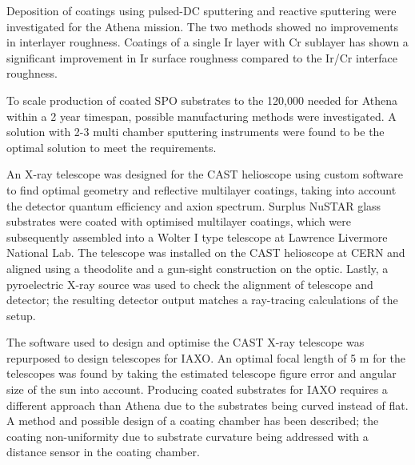Deposition of coatings using pulsed-DC sputtering and reactive sputtering were investigated for the Athena mission. The two methods showed no improvements in interlayer roughness. Coatings of a single Ir layer with Cr sublayer has shown a significant improvement in Ir surface roughness compared to the Ir/Cr interface roughness.

To scale production of coated SPO substrates to the 120,000 needed for Athena within a 2 year timespan, possible manufacturing methods were investigated. A solution with 2-3 multi chamber sputtering instruments were found to be the optimal solution to meet the requirements.

An X-ray telescope was designed for the CAST helioscope using custom software to find optimal geometry and reflective multilayer coatings, taking into account the detector quantum efficiency and axion spectrum. Surplus NuSTAR glass substrates were coated with optimised multilayer coatings, which were subsequently assembled into a Wolter I type telescope at Lawrence Livermore National Lab. The telescope was installed on the CAST helioscope at CERN and aligned using a theodolite and a gun-sight construction on the optic. Lastly, a pyroelectric X-ray source was used to check the alignment of telescope and detector; the resulting detector output matches a ray-tracing calculations of the setup.

The software used to design and optimise the CAST X-ray telescope was repurposed to design telescopes for IAXO. An optimal focal length of 5 m for the telescopes was found by taking the estimated telescope figure error and angular size of the sun into account. Producing coated substrates for IAXO requires a different approach than Athena due to the substrates being curved instead of flat. A method and possible design of a coating chamber has been described; the coating non-uniformity due to substrate curvature being addressed with a distance sensor in the coating chamber.

